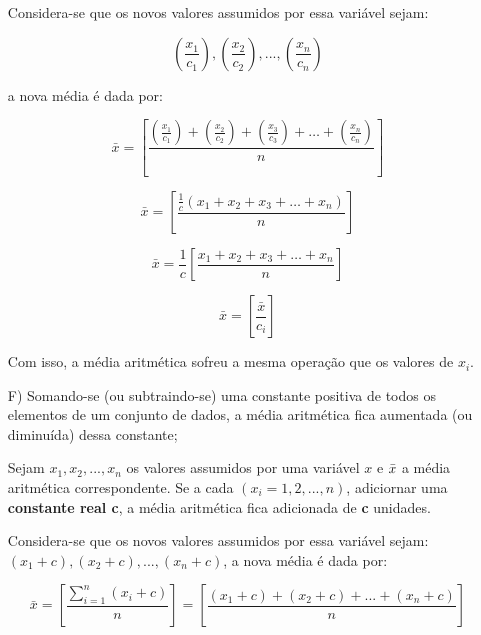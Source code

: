 \begin{enumerate}
Considera-se que os novos valores assumidos por essa variável sejam: 

$$\left( \frac{x_{1}}{c_{1}} \right), \left( \frac{x_{2}}{c_{2}} \right),..., \left( \frac{x_{n}}{c_{n}}\right)$$


a nova média é dada por:

\begin{equation*}\label{media3}
     \bar{x} = \left[ \frac{\left( \frac{x_{1}}{c_{1}} \right)+ \left( \frac{x_{2}}{c_{2}} \right)+ \left( \frac{x_{3}}{c_{3}}\right)+\ldots+\left( \frac{x_{n}}{c_{n}} \right)}{n} \right]
\end{equation*}

\begin{equation*}\label{media3}
     \bar{x}= \left[ \frac{ \frac{1}{c} \left( x_{1}+x_{2}+x_{3}+\ldots+x_{n} \right)}{n} \right]
\end{equation*}

\begin{equation*}\label{media3}
     \bar{x}= \frac{1}{c} \left[ \frac{x_{1}+x_{2}+x_{3}+\ldots+x_{n}}{n} \right]
\end{equation*}

\begin{equation*}\label{media3}
     \bar{x}= \left[ \frac{\bar{x}}{c_{i}} \right]
\end{equation*}

Com isso, a média aritmética sofreu a mesma operação que os valores de $x_{i}$.

\item [{F)}] Somando-se (ou subtraindo-se) uma constante positiva de todos os elementos de um conjunto de dados, a média aritmética fica aumentada (ou diminuída) dessa constante;

\newpage
\textbf{} 
\vskip0.3cm

Sejam $x_{1}, x_{2},...,x_{n}$ os valores assumidos por uma variável $x$ e $\Bar{x}$ a média aritmética correspondente. Se a cada $(x_{i}=1,2,...,n)$, adiciornar uma \textbf{constante real c}, a média aritmética fica adicionada de \textbf{c} unidades.\vskip0.3cm

Considera-se que os novos valores assumidos por essa variável sejam: $(x_{1}+c),(x_{2}+c),...,(x_{n}+c)$, a nova média é dada por:

\begin{equation*}\label{media3}
     \bar{x} = \left[ \frac{\sum_{i=1}^{n}(x_{i}+c)}{n} \right] =  \left[  \frac{(x_{1}+c)+(x_{2}+c)+...+(x_{n}+c)}{n} \right]
\end{equation*}


\end{enumerate}
